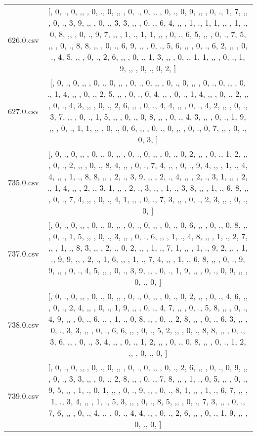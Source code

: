 \begin{table}[ht]
\begin{tabular}{@{}c c@{}}
	626.0.csv & [, 0, ., 0, ,,  , 0, ., 0, ,,  , 0, ., 0, ,,  , 0, ., 0, 9, ,,  , 0, ., 1, 7, ,,  , 0, ., 3, 9, ,,  , 0, ., 3, 3, ,,  , 0, ., 6, 4, ,,  , 1, ., 1, 1, ,,  , 1, ., 0, 8, ,,  , 0, ., 9, 7, ,,  , 1, ., 1, 1, ,,  , 0, ., 6, 5, ,,  , 0, ., 7, 5, ,,  , 0, ., 8, 8, ,,  , 0, ., 6, 9, ,,  , 0, ., 5, 6, ,,  , 0, ., 6, 2, ,,  , 0, ., 4, 5, ,,  , 0, ., 2, 6, ,,  , 0, ., 1, 3, ,,  , 0, ., 1, 1, ,,  , 0, ., 1, 9, ,,  , 0, ., 0, 2, ]\\ 
	627.0.csv & [, 0, ., 0, ,,  , 0, ., 0, ,,  , 0, ., 0, ,,  , 0, ., 0, ,,  , 0, ., 0, ,,  , 0, ., 1, 4, ,,  , 0, ., 2, 5, ,,  , 0, ., 0, 4, ,,  , 0, ., 1, 4, ,,  , 0, ., 2, ,,  , 0, ., 4, 3, ,,  , 0, ., 2, 6, ,,  , 0, ., 4, 4, ,,  , 0, ., 4, 2, ,,  , 0, ., 3, 7, ,,  , 0, ., 1, 5, ,,  , 0, ., 0, 8, ,,  , 0, ., 4, 3, ,,  , 0, ., 1, 9, ,,  , 0, ., 1, 1, ,,  , 0, ., 0, 6, ,,  , 0, ., 0, ,,  , 0, ., 0, 7, ,,  , 0, ., 0, 3, ]\\ 
	735.0.csv & [, 0, ., 0, ,,  , 0, ., 0, ,,  , 0, ., 0, ,,  , 0, ., 0, 2, ,,  , 0, ., 1, 2, ,,  , 0, ., 2, ,,  , 0, ., 8, 4, ,,  , 0, ., 7, 4, ,,  , 0, ., 9, 4, ,,  , 1, ., 4, 4, ,,  , 1, ., 8, 8, ,,  , 2, ., 3, 9, ,,  , 2, ., 4, ,,  , 2, ., 3, 1, ,,  , 2, ., 1, 4, ,,  , 2, ., 3, 1, ,,  , 2, ., 3, ,,  , 1, ., 3, 8, ,,  , 1, ., 6, 8, ,,  , 0, ., 7, 4, ,,  , 0, ., 4, 1, ,,  , 0, ., 7, 3, ,,  , 0, ., 2, 3, ,,  , 0, ., 0, ]\\ 
	737.0.csv & [, 0, ., 0, ,,  , 0, ., 0, ,,  , 0, ., 0, ,,  , 0, ., 0, 6, ,,  , 0, ., 0, 8, ,,  , 0, ., 1, 5, ,,  , 0, ., 3, ,,  , 0, ., 6, ,,  , 1, ., 4, 8, ,,  , 1, ., 2, 7, ,,  , 1, ., 8, 3, ,,  , 2, ., 0, 2, ,,  , 1, ., 7, 1, ,,  , 1, ., 9, 2, ,,  , 1, ., 9, 9, ,,  , 2, ., 1, 6, ,,  , 1, ., 7, 4, ,,  , 1, ., 6, 8, ,,  , 0, ., 9, 9, ,,  , 0, ., 4, 5, ,,  , 0, ., 3, 9, ,,  , 0, ., 1, 9, ,,  , 0, ., 0, 9, ,,  , 0, ., 0, ]\\ 
	738.0.csv & [, 0, ., 0, ,,  , 0, ., 0, ,,  , 0, ., 0, ,,  , 0, ., 0, 2, ,,  , 0, ., 4, 6, ,,  , 0, ., 2, 4, ,,  , 0, ., 1, 9, ,,  , 0, ., 4, 7, ,,  , 0, ., 5, 8, ,,  , 0, ., 4, 9, ,,  , 0, ., 6, ,,  , 1, ., 0, 8, ,,  , 0, ., 2, 8, ,,  , 0, ., 6, 3, ,,  , 0, ., 3, 3, ,,  , 0, ., 6, 6, ,,  , 0, ., 5, 2, ,,  , 0, ., 8, 8, ,,  , 0, ., 3, 6, ,,  , 0, ., 3, 4, ,,  , 0, ., 1, 2, ,,  , 0, ., 0, 8, ,,  , 0, ., 1, 2, ,,  , 0, ., 0, ]\\ 
	739.0.csv & [, 0, ., 0, ,,  , 0, ., 0, ,,  , 0, ., 0, ,,  , 0, ., 2, 6, ,,  , 0, ., 0, 9, ,,  , 0, ., 3, 3, ,,  , 0, ., 2, 8, ,,  , 0, ., 7, 8, ,,  , 1, ., 0, 5, ,,  , 0, ., 9, 5, ,,  , 1, ., 0, 1, ,,  , 0, ., 9, ,,  , 0, ., 8, 1, ,,  , 1, ., 6, 7, ,,  , 1, ., 3, 4, ,,  , 1, ., 5, 3, ,,  , 0, ., 8, 5, ,,  , 0, ., 7, 3, ,,  , 0, ., 7, 6, ,,  , 0, ., 4, ,,  , 0, ., 4, 4, ,,  , 0, ., 2, 6, ,,  , 0, ., 1, 9, ,,  , 0, ., 0, ]\\ 

\end{tabular}
\end{table}

